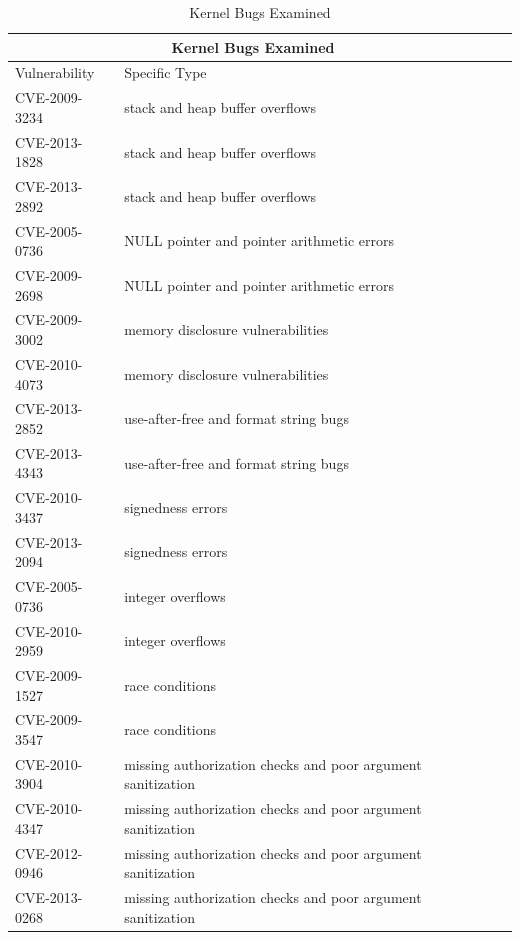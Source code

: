 \begin{table}[t]
\begin{tabular*}{\textwidth}{l @{\extracolsep{\fill}} lc}
\toprule
\multicolumn{2}{c}{Kernel Bugs Examined} \\
\midrule
Vulnerability    &  Specific Type \\
\midrule
 CVE-2009-3234 \cite{CVE:20093234} & stack and heap buffer overflows \\
 CVE-2013-1828 \cite{CVE:20131828} & stack and heap buffer overflows \\
 CVE-2013-2892 \cite{CVE:20132892} & stack and heap buffer overflows \\
 CVE-2005-0736 \cite{CVE:20050736} & NULL pointer and pointer arithmetic errors \\
 CVE-2009-2698 \cite{CVE:20092698} & NULL pointer and pointer arithmetic errors \\
 CVE-2009-3002 \cite{CVE:20093002} &  memory disclosure vulnerabilities \\
 CVE-2010-4073 \cite{CVE:20104073} &  memory disclosure vulnerabilities \\
 CVE-2013-2852 \cite{CVE:20132852} &  use-after-free and format string bugs \\
 CVE-2013-4343 \cite{CVE:20134343} &  use-after-free and format string bugs \\
 CVE-2010-3437 \cite{CVE:20103437} &  signedness errors \\
 CVE-2013-2094 \cite{CVE:20132094} &  signedness errors \\
 CVE-2005-0736 \cite{CVE:20050736} &  integer overflows \\
 CVE-2010-2959 \cite{CVE:20102959} &  integer overflows \\
 CVE-2009-1527 \cite{CVE:20091527} &  race conditions \\
 CVE-2009-3547 \cite{CVE:20093547} &  race conditions \\
 CVE-2010-3904 \cite{CVE:20103904} &  missing authorization checks and poor argument sanitization\\
 CVE-2010-4347 \cite{CVE:20104347} &  missing authorization checks and poor argument sanitization\\
 CVE-2012-0946 \cite{CVE:20120946} &  missing authorization checks and poor argument sanitization\\
 CVE-2013-0268 \cite{CVE:20130268} &  missing authorization checks and poor argument sanitization\\
\bottomrule
\end{tabular*}
\caption {Kernel Bugs Examined}
\label{table:kernel_bugs}
\end{table}

